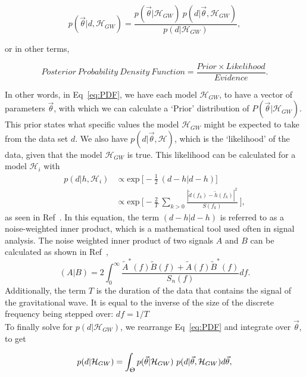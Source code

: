 \documentclass{article}
\begin{document}
\begin{equation} \label{eq:PDF}
p(\vec{\theta}|d, \mathcal{H}_{GW})  = \frac{p(\vec{\theta}| \mathcal{H}_{GW}) \ p(d|\vec{\theta},  \mathcal{H}_{GW})}  { p(d|\mathcal{H}_{GW})},
\end{equation} 

or in other terms, 

\begin{equation} \label{eq:englishTheorem}
{ Posterior \ Probability \ Density \ Function}  = \frac{ Prior  \times Likelihood}{Evidence}. \nonumber
\end{equation} 

In other words, in Eq~\ref{eq:PDF}, we have each model $ \mathcal{H}_{GW}$, to have a vector of parameters $\vec{\theta}$, with which we can calculate a `Prior' distribution of $P(\vec{\theta}| \mathcal{H}_{GW})$. This prior states what specific values the model $ \mathcal{H}_{GW}$ might be expected to take from the data set $d$. We also have $p(d|\vec{\theta},  \mathcal{H})$, which is the `likelihood' of the data, given that the model $ \mathcal{H}_{GW}$ is true. This likelihood can be calculated for a model $\mathcal{H}_{i}$ with
\begin{align}\label{eq:likelihood}
p(d|h, \mathcal{H}_{i}) & \propto \text{exp} \ \bigg[-\frac{1}{2} \ (d-h|d-h)\bigg] \nonumber \\ 
& \propto \text{exp} \ \bigg[-\frac{2}{T} \ \sum_{k>0} \frac{ | \tilde{d}(f_k) - \tilde{h}(f_k) | ^ 2 }{S(f_k)}\ \bigg],
\end{align}
as seen in Ref~\cite{BaeStats}. In this equation, the term $(d-h|d-h)$ is referred to as a noise-weighted inner product, which is a mathematical tool used often in signal analysis. The noise weighted inner product of two signals $A$ and $B$ can be calculated as shown in Ref~\cite{lindblom2008model}, $$(A|B) = 2 \int_{0}^{\infty} {\frac{\tilde{A}^* (f)  \tilde{B} (f)  +  \tilde{A} (f)  \tilde{B}^* (f) }{S_n(f)}}df. $$ Additionally, the term $T$ is the duration of the data that contains the signal of the gravitational wave. It is equal to the inverse of the size of the discrete frequency being stepped over: $df = 1/T$ \\





To finally solve for $p(d|\mathcal{H}_{GW})$, we rearrange Eq~\ref{eq:PDF} and integrate over $\vec{\theta}$, to get 

\begin{equation} \label{eq:evidence}
 p(d|\mathcal{H}_{GW})    = \int_{\Uptheta} p(\vec{\theta}| \mathcal{H}_{GW}) \ p(d|\vec{\theta},  \mathcal{H}_{GW}) d\vec{\theta},
\end{equation}
\end{document}

